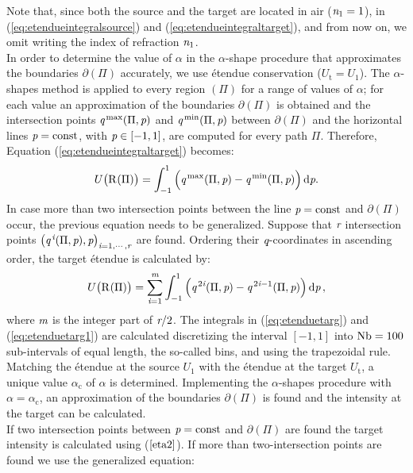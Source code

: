 Note that, since both the source and the target are located in air ($\textit{n}_1=1$), in (\ref{eq:etendueintegralsource}) and (\ref{eq:etendueintegraltarget}), and from now on, we omit writing the index of refraction $\textit{n}_1$.
\\ \indent In order to determine the value of $\alpha$ in the $\alpha$-shape procedure that approximates the boundaries $\partial$$(\Pi)$ accurately, we use \'{e}tendue conservation ($U_{\textrm{t}}= U_1$). The $\alpha$-shapes method is applied to every region $(\Pi)$ for a range of values of $\alpha$;
   for each value an approximation of the boundaries $\partial$$(\Pi)$ is obtained and
   the intersection points $\textit{q}^{\textrm{\,max}}(\Pi,\textit{p})$ and $\textit{q}^{\textrm{\,min}}(\Pi,\textit{p})$ between $\partial$$(\Pi)$
and the horizontal lines $\textit{p}=\textrm{const}$, with $\textit{p}\in[-1,1]$, are computed for every path $\Pi$.
Therefore, Equation (\ref{eq:etendueintegraltarget}) becomes:
\begin{equation}\label{eq:etenduetarg}
 U\big(\mbox{$\textup{R}_{\textit{}}$}(\Pi)\big)= \int_{-1}^{1}{\Big(\textit{q}^{\textrm{\,max}}(\Pi,\textit{p})-\textit{q}^{\textrm{\,min}}(\Pi,\textit{p})\Big)} \,\textrm{d}\textit{p}.
\end{equation} In case more than two intersection points between the line $\textit{p}=\textrm{const}$ and $\partial$$(\Pi)$ occur, the previous equation needs to be generalized. Suppose that $\textit{r}$ intersection points $\big(\textit{q}^{\,\textit{i}}(\Pi,\textit{p}), \textit{p}\big)_{\textit{i} = 1, \cdots, \textit{r}}$ are found. 
Ordering their $\textit{q}$-coordinates in ascending order, the target \'{e}tendue is calculated by:
\begin{equation}\label{eq:etenduetarg1}
 U\big(\mbox{$\textup{R}_{\textit{}}$}(\Pi)\big) = \sum_{\textit{i} = 1}^{\textit{m}}\int_{-1}^{1}
{\Big(\textit{q}^{\,2\textit{i}}(\Pi,\textit{p})}-{\textit{q}^{\,2\textit{i}-1} (\Pi, \textit{p}) \Big)}\,\textrm{d}\textit{p}\,,
\end{equation}
where $\textit{m}$ is the integer part of $\textit{r}/2$. 
The integrals in (\ref{eq:etenduetarg}) and (\ref{eq:etenduetarg1}) are calculated discretizing the interval $[-1, 1]$
   into $\textrm{Nb}=100$ sub-intervals of equal length, the so-called bins, and using the trapezoidal rule.
\\ \indent Matching the \'{e}tendue at the source $U_1$ with the \'{e}tendue at the target $U_{\textrm{t}}$, a unique value $\alpha_{\textrm{c}}$ of $\alpha$ is determined. Implementing the $\alpha$-shapes procedure with $\alpha = \alpha_\textrm{c}$, an approximation of the boundaries $\partial$$(\Pi)$ is found and the intensity at the target can be calculated.\\ \indent If two intersection points between $\textit{p}=\textrm{const}$ and $\partial$$(\Pi)$ are found the target intensity is calculated using ($\ref{eta2}$). If more than two-intersection points are found we use the generalized equation:
